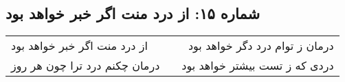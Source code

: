 \begin{center}
\section*{شماره ۱۵: از درد منت اگر خبر خواهد بود}
\label{sec:015}
\begin{longtable}{l p{0.5cm} r}
از درد منت اگر خبر خواهد بود
&&
درمان ز توام درد دگر خواهد بود
\\
درمان چکنم درد ترا چون هر روز
&&
دردی که ز تست بیشتر خواهد بود
\\
\end{longtable}
\end{center}
